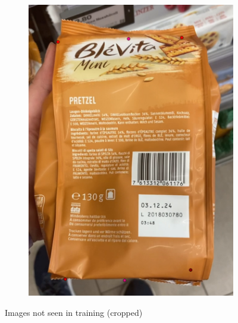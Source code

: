 \documentclass[a4paper,11pt]{report}
\begin{document}
\begin{figure}[h]
\begin{subfigure}{0.45\textwidth}
                    \caption{}
                    \label{fig:rhlf_full_image_1}
                \end{subfigure}
                \hfill
                \begin{subfigure}{0.45\textwidth}
                    \centering
                    \includegraphics[width=\textwidth]{rhlf_full_image_2.png}
                    \caption{}
                    \label{fig:rhlf_full_image_2}
                \end{subfigure}
                \caption{Images not seen in training (cropped)}
                \label{fig:subsection-result}
            \end{figure}
            
    
\end{document}
